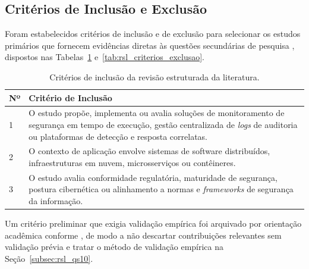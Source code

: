 \subsection{Critérios de Inclusão e Exclusão}
\label{subsec:rsl_criterios}

Foram estabelecidos critérios de inclusão e de exclusão para selecionar os estudos primários que fornecem evidências diretas às questões secundárias de pesquisa \cite{kitchenham2007}, dispostos nas Tabelas~\ref{tab:rsl_criterios_inclusao} e~\ref{tab:rsl_criterios_exclusao}.

\begin{table}[!htbp]
    \centering
    \caption{Critérios de inclusão da revisão estruturada da literatura.}
    \label{tab:rsl_criterios_inclusao}
    \small
    \begin{tabular}{p{1.2cm}p{13.2cm}}
        \hline
        \textbf{Nº} & \textbf{Critério de Inclusão} \\ \hline
        1 & O estudo propõe, implementa ou avalia soluções de monitoramento de segurança em tempo de execução, gestão centralizada de \textit{logs} de auditoria ou plataformas de detecção e resposta correlatas. \\ \hline
        2 & O contexto de aplicação envolve sistemas de software distribuídos, infraestruturas em nuvem, microsserviços ou contêineres. \\ \hline
        3 & O estudo avalia conformidade regulatória, maturidade de segurança, postura cibernética ou alinhamento a normas e \textit{frameworks} de segurança da informação. \\ \hline
    \end{tabular}
\end{table}

Um critério preliminar que exigia validação empírica foi arquivado por orientação acadêmica conforme , de modo a não descartar contribuições relevantes sem validação prévia e tratar o método de validação empírica na Seção~\ref{subsec:rsl_qs10}.

